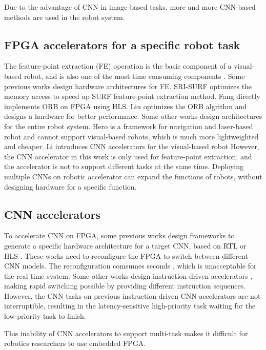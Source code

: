 Due to the advantage of CNN in image-based tasks, more and more CNN-based methods are used in the robot system.


\subsection{ FPGA accelerators for a specific robot task }

The feature-point extraction (FE) operation is the basic component of a visual-based robot, and is also one of the most time consuming components \cite{fang2017fpga}.
Some previous works design hardware architectures for FE.
SRI-SURF \cite{jia2016sri} optimizes the memory access to speed up SURF \cite{bay2006surf} feature-point extraction method. 
Fang \cite{fang2017fpga} directly implements ORB on FPGA using HLS. Liu \cite{liu2019eslam} optimizes the ORB algrithm and designs a hardware for better performance.
Some other works design architectures for the entire robot system. Hero \cite{shi2018hero} is a framework for navigation and laser-based robot and cannot support visual-based robots, which is much more lightweighted and cheaper. 
Li \cite{li2019879gops} introduces CNN accelerators for the visual-based robot
However, the CNN accelerator in this work\cite{li2019879gops} is only used for feature-point extraction, and the accelerator is not to support different tasks at the same time. 
Deploying multiple CNNs on robotic accelerator can expand the functions of robots, without designing hardware for a specific function.



\subsection{ CNN accelerators }

To accelerate CNN on FPGA, some previous works design frameworks to generate a specific hardware architecture for a target CNN, based on  RTL \cite{li_high_2016} or HLS \cite{lu_evaluating_2017}. These works need to reconfigure the FPGA to switch between different CNN models. The reconfiguration comsumes seconds \cite{FPGAPerformance}, which is unacceptable for the real time system.
Some other works design instruction-driven accelerators \cite{yu2018instruction,qiu2016going,guo2017angel}, making rapid switching possible by providing different instruction sequences. 
However, the CNN tasks on previous instruction-driven CNN accelerators are not interruptible, resulting in the latency-sensitive high-priority task waiting for the low-priority task to finish. 

This inability of CNN accelerators to support multi-task makes it difficult for robotics researchers to use embedded FPGA.

